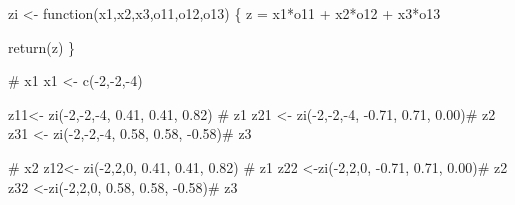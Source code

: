 \documentclass[
  letterpaper,
  DIV=11,
  numbers=noendperiod]{scrartcl}
\newenvironment{Shaded}{\begin{snugshade}}{\end{snugshade}}
\newcommand{\CommentTok}[1]{\textcolor[rgb]{0.37,0.37,0.37}{#1}}
\newcommand{\ControlFlowTok}[1]{\textcolor[rgb]{0.00,0.23,0.31}{#1}}
\newcommand{\DecValTok}[1]{\textcolor[rgb]{0.68,0.00,0.00}{#1}}
\newcommand{\FloatTok}[1]{\textcolor[rgb]{0.68,0.00,0.00}{#1}}
\newcommand{\FunctionTok}[1]{\textcolor[rgb]{0.28,0.35,0.67}{#1}}
\newcommand{\NormalTok}[1]{\textcolor[rgb]{0.00,0.23,0.31}{#1}}
\newcommand{\OtherTok}[1]{\textcolor[rgb]{0.00,0.23,0.31}{#1}}
\newcommand{\SpecialCharTok}[1]{\textcolor[rgb]{0.37,0.37,0.37}{#1}}
\begin{document}
\begin{Shaded}
\begin{Highlighting}[]
\NormalTok{zi }\OtherTok{\textless{}{-}} \ControlFlowTok{function}\NormalTok{(x1,x2,x3,o11,o12,o13)}
\NormalTok{\{}
\NormalTok{    z }\OtherTok{=}\NormalTok{ x1}\SpecialCharTok{*}\NormalTok{o11 }\SpecialCharTok{+}\NormalTok{ x2}\SpecialCharTok{*}\NormalTok{o12 }\SpecialCharTok{+}\NormalTok{ x3}\SpecialCharTok{*}\NormalTok{o13}

        \FunctionTok{return}\NormalTok{(z)}
\NormalTok{\}}


\CommentTok{\# x1}
\NormalTok{x1 }\OtherTok{\textless{}{-}}  \FunctionTok{c}\NormalTok{(}\SpecialCharTok{{-}}\DecValTok{2}\NormalTok{,}\SpecialCharTok{{-}}\DecValTok{2}\NormalTok{,}\SpecialCharTok{{-}}\DecValTok{4}\NormalTok{)}

\NormalTok{z11}\OtherTok{\textless{}{-}} \FunctionTok{zi}\NormalTok{(}\SpecialCharTok{{-}}\DecValTok{2}\NormalTok{,}\SpecialCharTok{{-}}\DecValTok{2}\NormalTok{,}\SpecialCharTok{{-}}\DecValTok{4}\NormalTok{, }\FloatTok{0.41}\NormalTok{, }\FloatTok{0.41}\NormalTok{, }\FloatTok{0.82}\NormalTok{) }\CommentTok{\# z1}
\NormalTok{z21 }\OtherTok{\textless{}{-}} \FunctionTok{zi}\NormalTok{(}\SpecialCharTok{{-}}\DecValTok{2}\NormalTok{,}\SpecialCharTok{{-}}\DecValTok{2}\NormalTok{,}\SpecialCharTok{{-}}\DecValTok{4}\NormalTok{, }\SpecialCharTok{{-}}\FloatTok{0.71}\NormalTok{, }\FloatTok{0.71}\NormalTok{, }\FloatTok{0.00}\NormalTok{)}\CommentTok{\# z2}
\NormalTok{z31 }\OtherTok{\textless{}{-}} \FunctionTok{zi}\NormalTok{(}\SpecialCharTok{{-}}\DecValTok{2}\NormalTok{,}\SpecialCharTok{{-}}\DecValTok{2}\NormalTok{,}\SpecialCharTok{{-}}\DecValTok{4}\NormalTok{, }\FloatTok{0.58}\NormalTok{, }\FloatTok{0.58}\NormalTok{, }\SpecialCharTok{{-}}\FloatTok{0.58}\NormalTok{)}\CommentTok{\# z3}

\CommentTok{\# x2}
\NormalTok{z12}\OtherTok{\textless{}{-}} \FunctionTok{zi}\NormalTok{(}\SpecialCharTok{{-}}\DecValTok{2}\NormalTok{,}\DecValTok{2}\NormalTok{,}\DecValTok{0}\NormalTok{, }\FloatTok{0.41}\NormalTok{, }\FloatTok{0.41}\NormalTok{, }\FloatTok{0.82}\NormalTok{) }\CommentTok{\# z1}
\NormalTok{z22 }\OtherTok{\textless{}{-}}\FunctionTok{zi}\NormalTok{(}\SpecialCharTok{{-}}\DecValTok{2}\NormalTok{,}\DecValTok{2}\NormalTok{,}\DecValTok{0}\NormalTok{, }\SpecialCharTok{{-}}\FloatTok{0.71}\NormalTok{, }\FloatTok{0.71}\NormalTok{, }\FloatTok{0.00}\NormalTok{)}\CommentTok{\# z2}
\NormalTok{z32 }\OtherTok{\textless{}{-}}\FunctionTok{zi}\NormalTok{(}\SpecialCharTok{{-}}\DecValTok{2}\NormalTok{,}\DecValTok{2}\NormalTok{,}\DecValTok{0}\NormalTok{, }\FloatTok{0.58}\NormalTok{, }\FloatTok{0.58}\NormalTok{, }\SpecialCharTok{{-}}\FloatTok{0.58}\NormalTok{)}\CommentTok{\# z3}


\end{Highlighting}
\end{Shaded}
\end{document}
